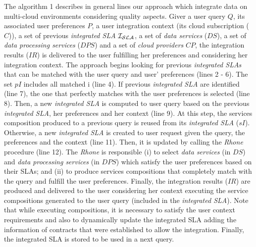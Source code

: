 The algorithm 1 describes in general lines our approach which integrate data on multi-cloud environments considering quality aspects. Giver a user query $Q$, its associated user preferences $P$, a user integration context (its cloud subscription ($C$)), a set of previous \textit{integrated SLA} $\bigSLA$, a set of \textit{data services} ($DS$), a set of \textit{data processing services} ($DPS$) and a set of \textit{cloud providers} $CP$, the integration results ($IR$) is delivered to the user fulfilling her preferences and considering her integration context. The approach begins looking for previous \textit{integrated SLAs} that can be matched with the user query and user' preferences (lines 2 - 6). The set $pI$ includes all matched i (line 4). If previous \textit{integrated SLA} are identified (line 7), the one that perfectly matches with the user preferences is selected (line 8). Then, a new \textit{integrated SLA} is computed to user query based on the previous \textit{integrated SLA}, her preferences and her context (line 9). At this step, the services composition produced to a previous query is reused from its \textit{integrated SLA} ($sI$). Otherwise, a new \textit{integrated SLA} is created to user request given the query, the preferences and the context (line 11). Then, it is updated by calling the \textit{Rhone} procedure (line 12). The \textit{Rhone} is responsible (i) to select \textit{data services} (in $DS$) and \textit{data processing services} (in $DPS$) which satisfy the user preferences based on their SLAs; and (ii) to produce services compositions that completely match with the query and fulfill the user preferences. Finally, the integration results ($IR$) are produced and delivered to the user considering her context executing the service compositions generated to the user query (included in the \textit{integrated SLA}). Note that while executing compositions, it is necessary to satisfy the user context requirements and also to dynamically update the integrated SLA adding the information of contracts that were established to allow the integration. Finally, the integrated SLA is stored to be used in a next query.   

